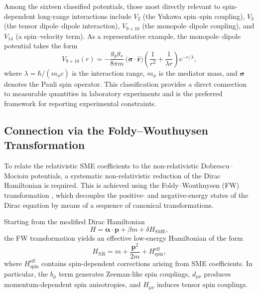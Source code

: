 \documentclass[12pt,a4paper]{report}
\begin{document}
Among the sixteen classified potentials, those most directly relevant to
spin-dependent long-range interactions include $V_{2}$ (the Yukawa spin--spin
coupling), $V_{3}$ (the tensor dipole--dipole interaction), $V_{9+10}$ (the
monopole--dipole coupling), and $V_{14}$ (a spin--velocity term). As a
representative example, the monopole--dipole potential takes the form
\begin{equation}
  V_{9+10}(r)
  = -\frac{g_{p}g_{s}}{8\pi m}\,
    \bigl(\boldsymbol{\sigma}\cdot\hat{\mathbf{r}}\bigr)
    \!\left(\frac{1}{r^{2}} + \frac{1}{\lambda r}\right)
    e^{-r/\lambda},
\end{equation}
where $\lambda = \hbar/(m_{\phi}c)$ is the interaction range, $m_{\phi}$ is the
mediator mass, and $\boldsymbol{\sigma}$ denotes the Pauli spin operator. This
classification provides a direct connection to measurable quantities in
laboratory experiments and is the preferred framework for reporting experimental
constraints.

\subsection{Connection via the Foldy--Wouthuysen Transformation}

To relate the relativistic SME coefficients to the non-relativistic
Dobrescu--Mocioiu potentials, a systematic non-relativistic reduction of the
Dirac Hamiltonian is required. This is achieved using the Foldy--Wouthuysen
(FW) transformation \cite{Foldy1950}, which decouples the positive- and
negative-energy states of the Dirac equation by means of a sequence of
canonical transformations.

Starting from the modified Dirac Hamiltonian
\begin{equation}
  H = \boldsymbol{\alpha}\cdot\mathbf{p} + \beta m + \delta H_{\mathrm{SME}},
\end{equation}
the FW transformation yields an effective low-energy Hamiltonian of the form
\begin{equation}
  H_{\mathrm{NR}}
  = m + \frac{\mathbf{p}^{2}}{2m} + H_{\mathrm{spin}}^{\mathrm{eff}},
\end{equation}
where $H_{\mathrm{spin}}^{\mathrm{eff}}$ contains spin-dependent corrections
arising from SME coefficients. In particular, the $b_{\mu}$ term generates
Zeeman-like spin couplings, $d_{\mu\nu}$ produces momentum-dependent spin
anisotropies, and $H_{\mu\nu}$ induces tensor spin couplings.
\end{document}
